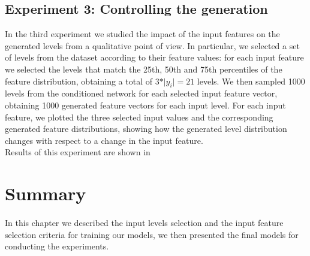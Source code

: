\subsection{Experiment 3: Controlling the generation}
In the third experiment we studied the impact of the input features on the generated levels from a qualitative point of view. In particular, we selected a set of levels from the dataset according to their feature values: for each input feature we selected the levels that match the 25th, 50th and 75th percentiles of the feature distribution, obtaining a total of $3 * \vert y_{i} \vert = 21$ levels. We then sampled 1000 levels from the conditioned network for each selected input feature vector, obtaining 1000 generated feature vectors for each input level. For each input feature, we plotted the three selected input values and the corresponding generated feature distributions, showing how the generated level distribution changes with respect to a change in the input feature. \\
Results of this experiment are shown in %


\section{Summary}
\paragraph{} In this chapter we described the input levels selection and the input feature selection criteria for training our models, we then presented the final models for conducting the experiments. 